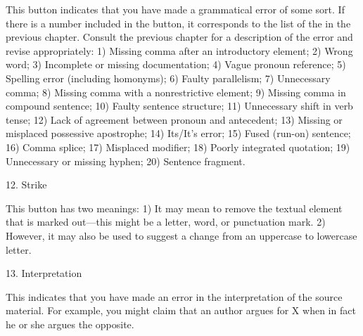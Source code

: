 This button indicates that you have made a grammatical error of some sort. If
there is a number included in the button, it corresponds to the list of the
\hyperlink{Top20}{\color{Ahrenge}{Twenty Most Common Errors}} in the previous
chapter. Consult the previous chapter for a description of the error and revise
appropriately: 1) Missing comma after an introductory element; 2) Wrong word; 3)
Incomplete or missing documentation; 4) Vague pronoun reference; 5) Spelling
error (including homonyms); 6) Faulty parallelism; 7) Unnecessary comma; 8)
Missing comma with a nonrestrictive element; 9) Missing comma in compound
sentence; 10) Faulty sentence structure; 11) Unnecessary shift in verb tense;
12) Lack of agreement between pronoun and antecedent; 13) Missing or misplaced
possessive apostrophe; 14) Its/It's error; 15) Fused (run-on) sentence; 16)
Comma splice; 17) Misplaced modifier; 18) Poorly integrated quotation; 19)
Unnecessary or missing hyphen; 20) Sentence fragment.


\bigskip

 \begin{center}
\bigskip

{\huge 12. Strike} \end{center}

This button has two meanings: 1) It may mean to remove the textual element that
is marked out—this might be a letter, word, or punctuation mark. 2) However, it
may also be used to suggest a change from an uppercase to lowercase letter.

 \begin{center}
\bigskip


{\huge 13. Interpretation} \end{center}

This indicates that you have made an error in the interpretation of the source
material. For example, you might claim that an author argues for X when in fact
he or she argues the opposite.

